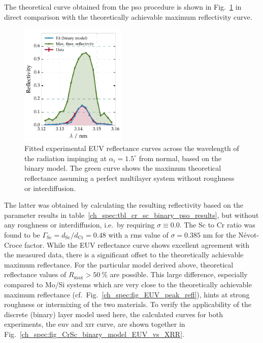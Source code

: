 The theoretical curve obtained from the \gls{pso} procedure is shown in Fig.~\ref{ch_spec:fig_CrSc_binary_fit_vs_max_refl} in direct comparison with the theoretically achievable maximum reflectivity curve.
\begin{figure}[htbp]
  \centering
  \includegraphics[width=0.45\textwidth]{img/CrSc_binary_fit_vs_max_refl}
  \caption[Fitted experimental EUV reflectance curves for the Cr/Sc sample.]{Fitted experimental EUV reflectance curves across the wavelength 
of the radiation impinging at $\alpha_i=1.5^\circ$ from normal, based on the binary 
model. The green curve shows the maximum theoretical reflectance assuming a perfect multilayer system without roughness or interdiffusion.}
  \label{ch_spec:fig_CrSc_binary_fit_vs_max_refl}
\end{figure}
The latter was obtained by calculating the resulting reflectivity based on the parameter results in table~\ref{ch_spec:tbl_cr_sc_binary_pso_results}, but without any roughness or interdiffusion, i.e.~by requiring $\sigma \equiv 0.0$. The Sc 
to Cr ratio was found to be $\Gamma_\text{Sc}= d_\text{Sc}/d_\text{Cr} = 0.48$ with a \gls{rms} value of $\sigma=0.385$ nm for the N\'{e}vot-Croce factor. While the EUV reflectance curve shows excellent agreement with the measured data, there is a significant offset to the theoretically achievable maximum reflectance. For the particular model derived above, theoretical reflectance values of $R_\text{max} > \SI{50}{\percent}$ are possible. This large difference, especially compared to Mo/Si systems which are very close to the theoretically achievable maximum reflectance (cf.~Fig.~\ref{ch_spec:fig_EUV_peak_refl}), hints at strong roughness or intermixing of the two materials. To verify the applicability of the discrete (binary) layer model used here, the calculated curves for both experiments, the \gls{euv} and \gls{xrr} curve, are shown together in Fig.~\ref{ch_spec:fig_CrSc_binary_model_EUV_vs_XRR}.
